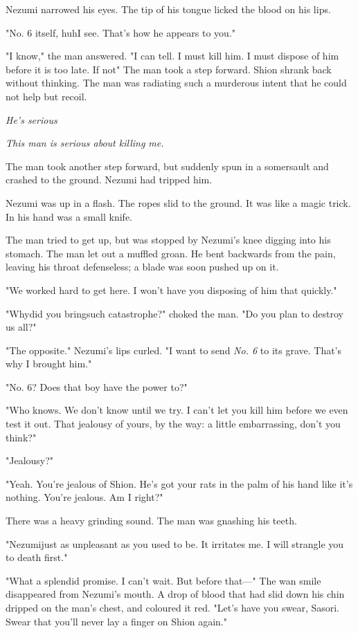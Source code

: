 Nezumi narrowed his eyes. The tip of his tongue licked the blood on his
lips.

"No. 6 itself, huh\el I see. That's how he appears to you."

"I know," the man answered. "I can tell. I must kill him. I must dispose
of him before it is too late. If not\el " The man took a step forward.
Shion shrank back without thinking. The man was radiating such a
murderous intent that he could not help but recoil.

\emph{He's serious\el }

\emph{This man is serious about killing me.}

The man took another step forward, but suddenly spun in a somersault and
crashed to the ground. Nezumi had tripped him.

Nezumi was up in a flash. The ropes slid to the ground. It was like a
magic trick. In his hand was a small knife.

The man tried to get up, but was stopped by Nezumi's knee digging into
his stomach. The man let out a muffled groan. He bent backwards from the
pain, leaving his throat defenseless; a blade was soon pushed up on it.

"We worked hard to get here. I won't have you disposing of him that
quickly."

"Why\el did you bring\el such catastrophe?" choked the man. "Do you plan
to destroy us all?"

"The opposite." Nezumi's lips curled. "I want to send \emph{No. 6} to its
grave. That's why I brought him."

"No. 6? Does that boy have the power to?"

"Who knows. We don't know until we try. I can't let you kill him before
we even test it out. That jealousy of yours, by the way: a little
embarrassing, don't you think?"

"Jealousy?"

"Yeah. You're jealous of Shion. He's got your rats in the palm of his
hand like it's nothing. You're jealous. Am I right?"

There was a heavy grinding sound. The man was gnashing his teeth.

"Nezumi\el just as unpleasant as you used to be. It irritates me. I will
strangle you to death first."

"What a splendid promise. I can't wait. But before that---" The wan smile
disappeared from Nezumi's mouth. A drop of blood that had slid down his
chin dripped on the man's chest, and coloured it red. "Let's have you
swear, Sasori. Swear that you'll never lay a finger on Shion again."


